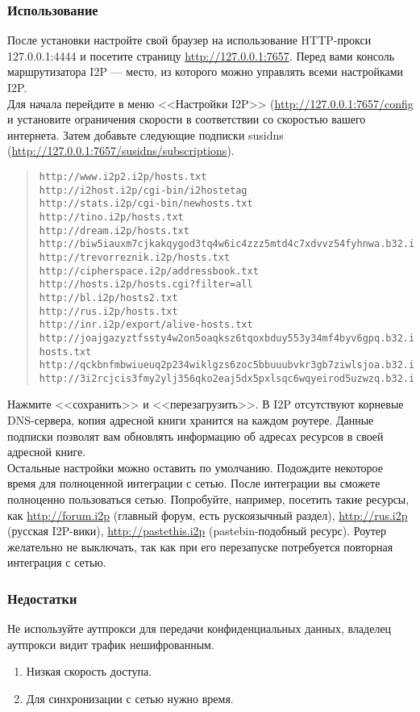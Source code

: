\subsubsection{Использование}
После установки настройте свой браузер на использование HTTP-прокси 127.0.0.1:4444 и посетите страницу \url{http://127.0.0.1:7657}. Перед вами консоль маршрутизатора I2P --- место, из которого можно управлять всеми настройками I2P.\\
Для начала перейдите в меню <<Настройки I2P>> (\url{http://127.0.0.1:7657/config} и установите ограничения скорости в соответствии со скоростью вашего интернета. Затем добавьте следующие подписки susidns (\url{http://127.0.0.1:7657/susidns/subscriptions}).
\scriptsize\begin{quote}\begin{verbatim}
http://www.i2p2.i2p/hosts.txt
http://i2host.i2p/cgi-bin/i2hostetag
http://stats.i2p/cgi-bin/newhosts.txt
http://tino.i2p/hosts.txt
http://dream.i2p/hosts.txt
http://biw5iauxm7cjkakqygod3tq4w6ic4zzz5mtd4c7xdvvz54fyhnwa.b32.i2p/uncensored_hosts.txt
http://trevorreznik.i2p/hosts.txt
http://cipherspace.i2p/addressbook.txt
http://hosts.i2p/hosts.cgi?filter=all
http://bl.i2p/hosts2.txt
http://rus.i2p/hosts.txt
http://inr.i2p/export/alive-hosts.txt
http://joajgazyztfssty4w2on5oaqksz6tqoxbduy553y34mf4byv6gpq.b32.i2p/export/alive-hosts.txt
http://qckbnfmbwiueuq2p234wiklgzs6zoc5bbuuubvkr3gb7ziwlsjoa.b32.i2p/list.txt
http://3i2rcjcis3fmy2ylj356qko2eaj5dx5pxlsqc6wqyeirod5uzwzq.b32.i2p/hosts.txt
\end{verbatim}\end{quote}\normalsize
Нажмите <<сохранить>> и <<перезагрузить>>. В I2P отсутствуют корневые DNS-сервера, копия адресной книги хранится на каждом роутере. Данные подписки позволят вам обновлять информацию об адресах ресурсов в своей адресной книге.\\
Остальные настройки можно оставить по умолчанию. Подождите некоторое время для полноценной интеграции с сетью. После интеграции вы сможете полноценно пользоваться сетью. Попробуйте, например, посетить такие ресурсы, как \url{http://forum.i2p} (главный форум, есть рускоязычный раздел), \url{http://rus.i2p} (русская I2P-вики), \url{http://pastethis.i2p} (pastebin-подобный ресурс). Роутер желательно не выключать, так как при его перезапуске потребуется повторная интеграция с сетью.
\subsubsection{Недостатки}
\begin{important}
Не используйте аутпрокси для передачи конфиденциальных данных, владелец аутпрокси видит трафик нешифрованным.
\end{important}
\begin{enumerate}
\item Низкая скорость доступа.
\item Для синхронизации с сетью нужно время.
\end{enumerate}
